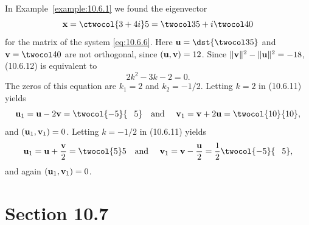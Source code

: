\setcounter{example}{4}
\begin{example}
  \label{example:10.6.5} \rm In Example~\ref{example:10.6.1} we found the eigenvector
  \[
    {\bf x}=\ctwocol{3+4i}5=\twocol35+i\twocol40
  \]
  for the matrix of the system \eqref{eq:10.6.6}. Here ${\bf u}=\dst{\twocol35}$ and
  ${\bf v}=\twocol40$ are not orthogonal, since $({\bf u},{\bf v})=12$. Since
  $\|{\bf v}\|^{2}-\|{\bf u}\|^{2}=-18$, \textup{(10.6.12)} is equivalent to
  \[
    2k^{2}-3k-2=0.
  \]
  The zeros of this equation are $k_{1}=2$ and $k_{2}=-1/2$. Letting $k=2$ in \textup{(10.6.11)}
  yields
  \[
    {\bf u}_{1}={\bf u}-2{\bf v}=\twocol{-5}{\phantom{-}5}\mbox{\quad and \quad}{\bf v}_{1}={\bf v}+2{\bf u}=\twocol{10}{10},
  \]
  and $({\bf u}_{1},{\bf v}_{1})=0$. Letting $k=-1/2$ in \textup{(10.6.11)} yields
  \[
    {\bf u}_{1}={\bf u}+\frac{{\bf v}}{2}=\twocol{5}5\mbox{\quad and \quad}{\bf v}_{1}={\bf v}-\frac{{\bf u}}{2}=\frac{1}{2}\twocol{-5}{\phantom{-}5},
  \]
  and again $({\bf u}_{1},{\bf v}_{1})=0$. \bbox
\end{example}

\section*{Section 10.7}
\setcounter{chapter}{10}
\setcounter{section}{7}

